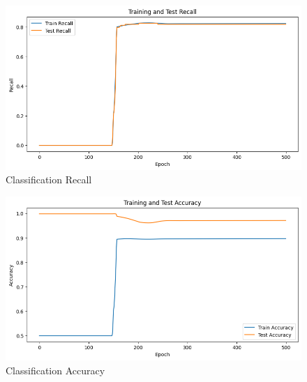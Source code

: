 \documentclass{article}
\begin{document}
\begin{figure}[H]
\centering
\includegraphics[width=1\linewidth]{img/C_R}
\caption{Classification Recall}
\label{fig:cr}
\end{figure}

\begin{figure}[H]
\centering
\includegraphics[width=1\linewidth]{img/C_A}
\caption{Classification Accuracy}
\label{fig:ca}
\end{figure}
\end{document}
